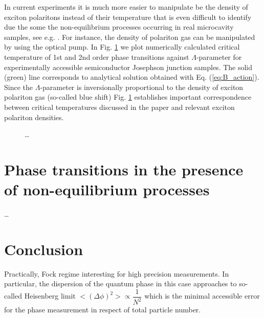 \documentclass[aps, pre, preprint, groupedaddress, superscriptaddress, showkeys, showpacs] {revtex4-1}
\begin{document}
In current experiments it is much more easier to manipulate be the density of exciton polaritons instead of their temperature that is even difficult to identify due the some the non-equilibrium processes occurring in real microcavity samples, see e.g. \cite{Sanvitto,Guillet}.
For instance, the density of polariton gas can be manipulated by using the optical pump.
In Fig. \ref{pic:temperatures} we plot numerically calculated critical temperature of 1st and 2nd order phase transitions against $\Lambda$-parameter for experimentally accessible semiconductor Josephson junction samples.
The solid (green) line corresponds to analytical solution obtained with  Eq. (\ref{eq:B_action}).
Since the $\Lambda$-parameter is inversionally proportional to the density of exciton polariton gas (so-called blue shift) Fig. \ref{pic:temperatures} establishes important correspondence between critical temperatures discussed in the paper and relevant exciton polariton densities.
%
\begin{figure}[ht]
\caption{\dots}
\label{pic:temperatures}
\end{figure}
%

\section{Phase transitions in the presence of non-equilibrium processes 
\label{sec:phase_transition}}

\dots

\section{Conclusion \label{sec:conclusion}}

Practically, Fock regime interesting for high precision measurements.
In particular, the dispersion of the quantum phase in this case approaches to so-called Heisenberg limit ${<(\Delta\phi)^2> \propto \dfrac{1}{N^2}}$ which is the minimal accessible error for the phase measurement in respect of total particle number.
\end{document}
